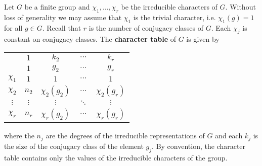 Let $G$ be a finite group and $\chi_1,\dots,\chi_r$ be the irreducible characters of $G$. Without loss of generality
we may assume that $\chi_1$ is the trivial character, i.e. $\chi_1(g)=1$ for all $g\in G$. 
Recall that $r$ is the number of conjugacy classes of $G$. Each $\chi_j$ is constant on conjugacy classes. 
The \textbf{character table} of 
$G$ is given by 
\begin{center}
\begin{tabular}{|c|cccc|}
\hline 
 & $1$ & $k_{2}$ & $\cdots$ & $k_{r}$\tabularnewline
 & $1$ & $g_{2}$ & $\cdots$ & $g_{r}$\tabularnewline
\hline 
$\chi_{1}$ & $1$ & $1$ & $\cdots$ & $1$\tabularnewline
$\chi_{2}$ & $n_{2}$ & $\chi_{2}(g_{2})$ & $\cdots$ & $\chi_{2}(g_{r})$\tabularnewline
$\vdots$ & $\vdots$ & $\vdots$ & $\ddots$ & $\vdots$\tabularnewline
$\chi_{r}$ & $n_{r}$ & $\chi_{r}(g_{2})$ & $\cdots$ & $\chi_{r}(g_{r})$\tabularnewline
\hline
\end{tabular}
\end{center}
where the $n_j$ are the degrees of the irreducible representations of $G$ and each $k_j$ is 
the size of the conjugacy class of the element $g_j$. By convention, the character table
contains only the values of the irreducible characters of the group. 

